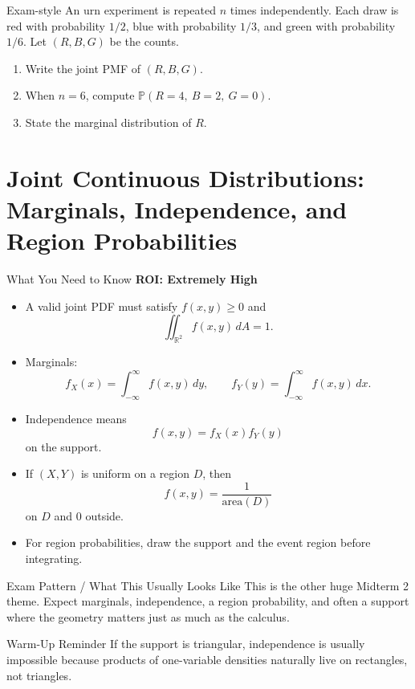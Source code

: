 \documentclass[12pt]{article}
\newcommand{\PP}{\mathbb{P}}
\newcommand{\writespace}[1]{\vspace*{#1}}
\newcommand{\longws}{\writespace{2.8cm}}
\newcommand{\roiline}[1]{\textbf{ROI: #1}}
\newcounter{problem}[section]
\begin{document}
\begin{practiceproblem}{Exam-style}
An urn experiment is repeated $n$ times independently. Each draw is red with probability $1/2$, blue with probability $1/3$, and green with probability $1/6$. Let $(R,B,G)$ be the counts.
\begin{enumerate}
  \item Write the joint PMF of $(R,B,G)$.
  \item When $n=6$, compute $\PP(R=4,\ B=2,\ G=0)$.
  \item State the marginal distribution of $R$.
\end{enumerate}
\end{practiceproblem}
\longws

\clearpage

\section{Joint Continuous Distributions: Marginals, Independence, and Region Probabilities}

\begin{summarybox}{What You Need to Know}
\roiline{Extremely High}
\begin{itemize}
  \item A valid joint PDF must satisfy $f(x,y)\ge 0$ and
  \[
    \iint_{\mathbb{R}^2} f(x,y)\,dA = 1.
  \]
  \item Marginals:
  \[
    f_X(x)=\int_{-\infty}^{\infty} f(x,y)\,dy,
    \qquad
    f_Y(y)=\int_{-\infty}^{\infty} f(x,y)\,dx.
  \]
  \item Independence means
  \[
    f(x,y)=f_X(x)f_Y(y)
  \]
  on the support.
  \item If $(X,Y)$ is uniform on a region $D$, then
  \[
    f(x,y)=\frac{1}{\text{area}(D)}
  \]
  on $D$ and $0$ outside.
  \item For region probabilities, draw the support and the event region before integrating.
\end{itemize}
\end{summarybox}

\begin{patternbox}{Exam Pattern / What This Usually Looks Like}
This is the other huge Midterm 2 theme. Expect marginals, independence, a region probability, and often a support where the geometry matters just as much as the calculus.
\end{patternbox}

\begin{examplebox}{Warm-Up Reminder}
If the support is triangular, independence is usually impossible because products of one-variable densities naturally live on rectangles, not triangles.
\end{examplebox}
\end{document}
